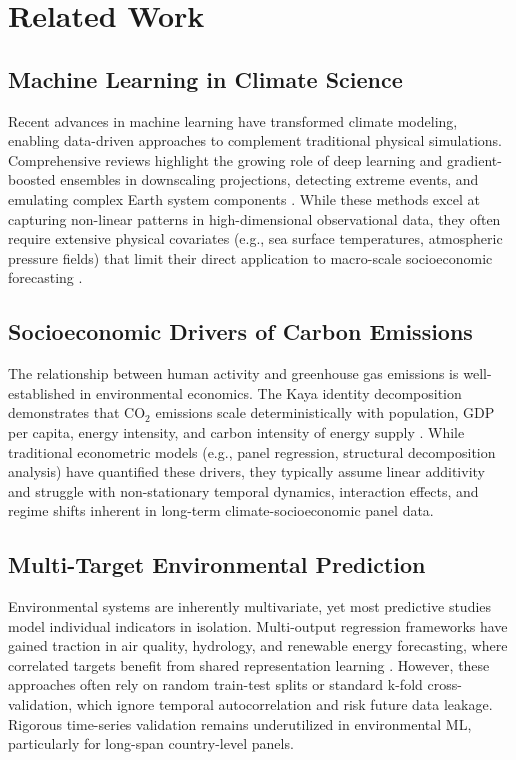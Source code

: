 \documentclass[12pt, a4paper]{article}
\begin{document}
\section{Related Work}

\subsection{Machine Learning in Climate Science}
Recent advances in machine learning have transformed climate modeling, enabling data-driven approaches to complement traditional physical simulations. Comprehensive reviews highlight the growing role of deep learning and gradient-boosted ensembles in downscaling projections, detecting extreme events, and emulating complex Earth system components \cite{rolnick2022tackling}. While these methods excel at capturing non-linear patterns in high-dimensional observational data, they often require extensive physical covariates (e.g., sea surface temperatures, atmospheric pressure fields) that limit their direct application to macro-scale socioeconomic forecasting \cite{ipcc2023synthesis}.

\subsection{Socioeconomic Drivers of Carbon Emissions}
The relationship between human activity and greenhouse gas emissions is well-established in environmental economics. The Kaya identity decomposition demonstrates that CO$_2$ emissions scale deterministically with population, GDP per capita, energy intensity, and carbon intensity of energy supply \cite{friedlingstein2022global}. While traditional econometric models (e.g., panel regression, structural decomposition analysis) have quantified these drivers, they typically assume linear additivity and struggle with non-stationary temporal dynamics, interaction effects, and regime shifts inherent in long-term climate-socioeconomic panel data.

\subsection{Multi-Target Environmental Prediction}
Environmental systems are inherently multivariate, yet most predictive studies model individual indicators in isolation. Multi-output regression frameworks have gained traction in air quality, hydrology, and renewable energy forecasting, where correlated targets benefit from shared representation learning \cite{demir2021multi}. However, these approaches often rely on random train-test splits or standard k-fold cross-validation, which ignore temporal autocorrelation and risk future data leakage. Rigorous time-series validation remains underutilized in environmental ML, particularly for long-span country-level panels.
\end{document}
